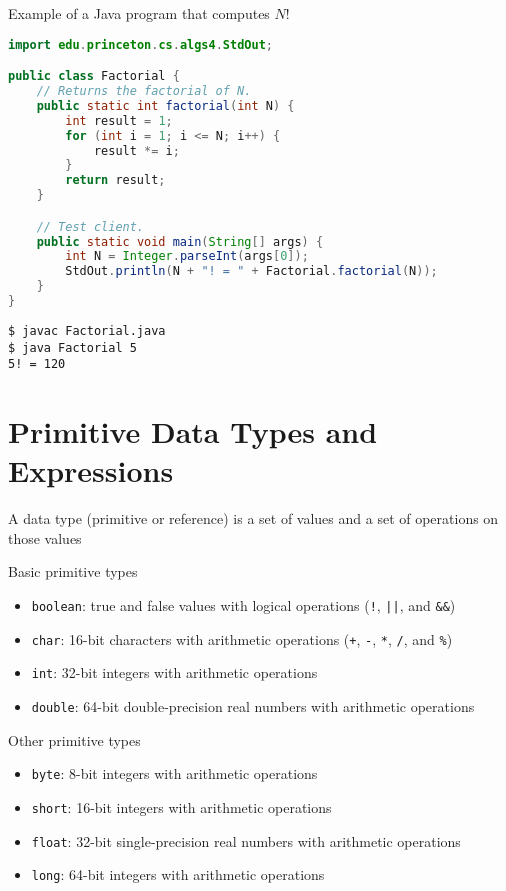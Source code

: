 \documentclass[8pt,a4paper,compress]{beamer}
\begin{document}
\begin{frame}[fragile]
Example of a Java program that computes $N!$

\begin{lstlisting}[language=Java]
import edu.princeton.cs.algs4.StdOut;

public class Factorial {
    // Returns the factorial of N.
    public static int factorial(int N) {
        int result = 1;
        for (int i = 1; i <= N; i++) {
            result *= i;
        }
        return result;
    }

    // Test client.
    public static void main(String[] args) {
        int N = Integer.parseInt(args[0]);
        StdOut.println(N + "! = " + Factorial.factorial(N));
    }
}
\end{lstlisting}

\begin{lstlisting}[language={}]
$ javac Factorial.java
$ java Factorial 5
5! = 120
\end{lstlisting}
\end{frame}

\section{Primitive Data Types and Expressions}

\begin{frame}[fragile]
A data type (primitive or reference) is a set of values and a set of operations on those values

\bigskip

Basic primitive types
\begin{itemize}
\item \lstinline{boolean}: true and false values with logical operations (\lstinline{!}, \lstinline{||}, and \lstinline{&&})
\item \lstinline{char}: 16-bit characters with arithmetic operations (\lstinline{+}, \lstinline{-}, \lstinline{*}, \lstinline{/}, and \lstinline{%})
\item \lstinline{int}: 32-bit integers with arithmetic operations
\item \lstinline{double}: 64-bit double-precision real numbers with arithmetic operations
\end{itemize}

\bigskip

Other primitive types
\begin{itemize}
\item \lstinline{byte}: 8-bit integers with arithmetic operations
\item \lstinline{short}: 16-bit integers with arithmetic operations
\item \lstinline{float}: 32-bit single-precision real numbers with arithmetic operations
\item \lstinline{long}: 64-bit integers with arithmetic operations
\end{itemize}
\end{frame}
\end{document}
